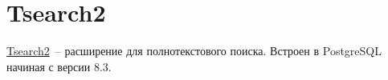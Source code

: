 \section{Tsearch2}

\href{https://www.postgresql.org/docs/current/static/tsearch2.html}{Tsearch2}~-- расширение для полнотекстового поиска. Встроен в PostgreSQL начиная с версии 8.3.